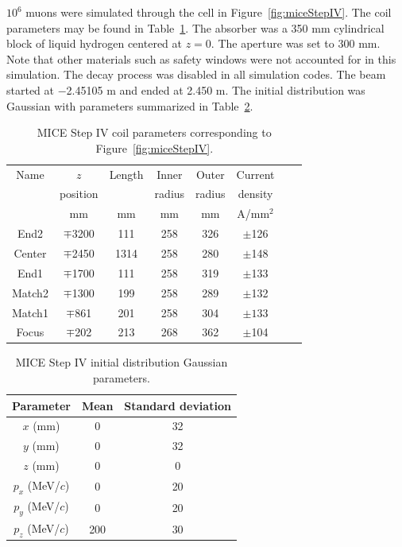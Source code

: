 \documentclass[a4paper,11pt]{article}
\begin{document}
$10^6$ muons were simulated through the cell in Figure~\ref{fig:miceStepIV}. The coil parameters may be found in Table~\ref{tbl:MICE_coil_parameters}. The absorber was a 350 mm cylindrical block of liquid hydrogen centered at $z=0$. The aperture was set to 300 mm. Note that other materials such as safety windows were not accounted for in this simulation. The decay process was disabled in all simulation codes. The beam started at $-$2.45105 m and ended at 2.450 m. The initial distribution was Gaussian with parameters summarized in Table~\ref{tbl:MICE_initial_distribution_parameters}.
\begin{table}[H]
\begin{center}
\caption[MICE Step IV coil parameters.]{MICE Step IV coil parameters corresponding to Figure~\ref{fig:miceStepIV}.}
\begin{tabularx}{0.6\columnwidth}{cccccccc}
\hline \hline
Name & $z$ & Length & Inner & Outer & Current \\
 & position & & radius & radius & density \\
 & mm & mm & mm & mm & A/mm$^2$  \\
\hline
	End2 & $\mp$3200 &111 & 258 &326 &$\pm$126 \\
	Center&$\mp$2450 &1314 & 258 &280 &$\pm$148 \\
	End1 & $\mp$1700 & 111 & 258 & 319 & $\pm$133 \\
	Match2 & $\mp$1300 & 199 & 258 & 289 & $\pm$132 \\
	Match1 & $\mp$861 & 201 & 258 & 304 & $\pm133$ \\
	Focus & $\mp$202 & 213 & 268 & 362 & $\pm$104 \\ 
\hline
\end{tabularx}
\end{center}
\label{tbl:MICE_coil_parameters}
\end{table}

\begin{table}
\begin{center}
\caption{MICE Step IV initial distribution Gaussian parameters.}
\begin{tabularx}{0.5\columnwidth}{ccc}
\hline \hline
Parameter & Mean & Standard deviation \\
\hline
	$x$ (mm) & 0 & 32\\
	$y$ (mm) & 0 & 32 \\
	$z$ (mm) & 0 & 0\\
	$p_x$ (MeV/$c$) & 0 & 20\\
	$p_y$ (MeV/$c$) & 0 & 20\\
	$p_z$ (MeV/$c$) & 200 & 30\\
\hline
\end{tabularx}
\end{center}
\label{tbl:MICE_initial_distribution_parameters}
\end{table}
\end{document}
